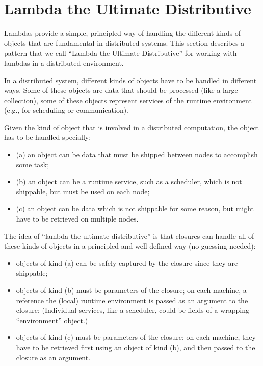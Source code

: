 \documentclass{llncs}
\begin{document}
\section{Lambda the Ultimate Distributive}

Lambdas provide a simple, principled way of handling the different kinds of
objects that are fundamental in distributed systems. This section describes a
pattern that we call ``Lambda the Ultimate Distributive'' for working with
lambdas in a distributed environment.

In a distributed system, different kinds of objects have to be handled in
different ways. Some of these objects are data that should be processed (like
a large collection), some of these objects represent services of the runtime
environment (e.g., for scheduling or communication).

Given the kind of object that is involved in a distributed computation, the
object has to be handled specially:
\begin{itemize}

\item (a) an object can be data that must be shipped between nodes to accomplish
some task;

\item (b) an object can be a runtime service, such as a scheduler, which is not
shippable, but must be used on each node;

\item (c) an object can be data which is not shippable for some reason, but might
have to be retrieved on multiple nodes.

\end{itemize}

The idea of ``lambda the ultimate distributive'' is that closures can handle
all of these kinds of objects in a principled and well-defined way (no
guessing needed):

\begin{itemize}

\item objects of kind (a) can be safely captured by the closure since they are shippable;

\item objects of kind (b) must be parameters of the closure; on each machine,
a reference the (local) runtime environment is passed as an argument to the
closure; (Individual services, like a scheduler, could be fields of a
wrapping ``environment'' object.)

\item objects of kind (c) must be parameters of the closure; on each machine,
they have to be retrieved first using an object of kind (b), and then passed
to the closure as an argument.

\end{itemize}
\end{document}
